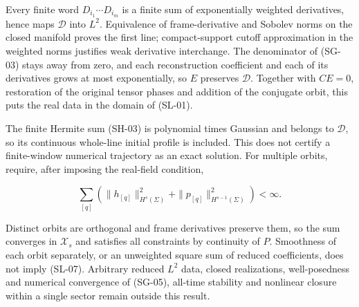 Every finite word $D_{i_1}\cdots D_{i_m}$ is a finite sum of exponentially weighted derivatives, hence maps $\mathcal D$ into $L^2$. Equivalence of frame-derivative and Sobolev norms on the closed manifold proves the first line; compact-support cutoff approximation in the weighted norms justifies weak derivative interchange. The denominator of (SG-03) stays away from zero, and each reconstruction coefficient and each of its derivatives grows at most exponentially, so $E$ preserves $\mathcal D$. Together with $CE=0$, restoration of the original tensor phases and addition of the conjugate orbit, this puts the real data in the domain of (SL-01).

The finite Hermite sum (SH-03) is polynomial times Gaussian and belongs to $\mathcal D$, so its continuous whole-line initial profile is included. This does not certify a finite-window numerical trajectory as an exact solution. For multiple orbits, require, after imposing the real-field condition,

\begin{equation}\tag{SL-07}\label{eq:SL-07}
\sum_{[q]}\left(\|h_{[q]}\|_{H^s(\Sigma)}^2
+\|p_{[q]}\|_{H^{s-1}(\Sigma)}^2\right)<\infty.
\end{equation}

Distinct orbits are orthogonal and frame derivatives preserve them, so the sum converges in $\mathcal X_s$ and satisfies all constraints by continuity of $P$. Smoothness of each orbit separately, or an unweighted square sum of reduced coefficients, does not imply (SL-07). Arbitrary reduced $L^2$ data, closed realizations, well-posedness and numerical convergence of (SG-05), all-time stability and nonlinear closure within a single sector remain outside this result.
